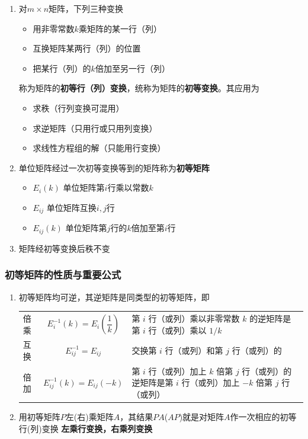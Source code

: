 \documentclass[./linear_algebra.tex]{subfiles}
\begin{document}
    \begin{enumerate}
        \item 对$m \times n$矩阵，下列三种变换
        \begin{itemize}
            \item 用非零常数$k$乘矩阵的某一行（列）
            \item 互换矩阵某两行（列）的位置
            \item 把某行（列）的$k$倍加至另一行（列）
        \end{itemize}
        称为矩阵的\textbf{初等行（列）变换}，统称为矩阵的\textbf{初等变换}。其应用为
        \begin{itemize}
            \item 求秩（行列变换可混用）
            \item 求逆矩阵（只用行或只用列变换）
            \item 求线性方程组的解（只能用行变换）
        \end{itemize}
        \item 单位矩阵经过一次初等变换等到的矩阵称为\textbf{初等矩阵}
        \begin{itemize}
            \item $E_{i}(k)$ 单位矩阵第$i$行乘以常数$k$
            \item $E_{ij}$ 单位矩阵互换$i,j$行
            \item $E_{ij}(k)$ 单位矩阵第$j$行的$k$倍加至第$i$行
        \end{itemize}
        \item 矩阵经初等变换后秩不变
    \end{enumerate}

    \subsubsection{初等矩阵的性质与重要公式}

    \begin{enumerate}
        \item 初等矩阵均可逆，其逆矩阵是同类型的初等矩阵，即 \\
        \renewcommand{\arraystretch}{1.2}  %
        \begin{tabularx}{\textwidth}{l c >{\raggedright\arraybackslash}X}
            倍乘 & $E_i^{-1}(k) = E_i(\dfrac{1}{k})$      & 第 $i$ 行（或列）乘以非零常数 $k$ 的逆矩阵是第 $i$ 行（或列）乘以 $1/k$                     \\
            互换 & $E_{ij}^{-1} = E_{ij}$        & 交换第 $i$ 行（或列）和第 $j$ 行（或列）的\textbf{\color{red}{逆矩阵是其本身}}            \\
            倍加 & $E_{ij}^{-1}(k) = E_{ij}(-k)$ & 第 $i$ 行（或列）加上 $k$ 倍第 $j$ 行（或列）的逆矩阵是第 $i$ 行（或列）加上 $-k$ 倍第 $j$ 行（或列） \\
        \end{tabularx}
        \item 用初等矩阵$P$左(右)乘矩阵$A$，其结果$PA$($AP$)就是对矩阵$A$作一次相应的初等行(列)变换 \; \Rightarrow \textbf{左乘行变换，右乘列变换}
    \end{enumerate}
\end{document}
